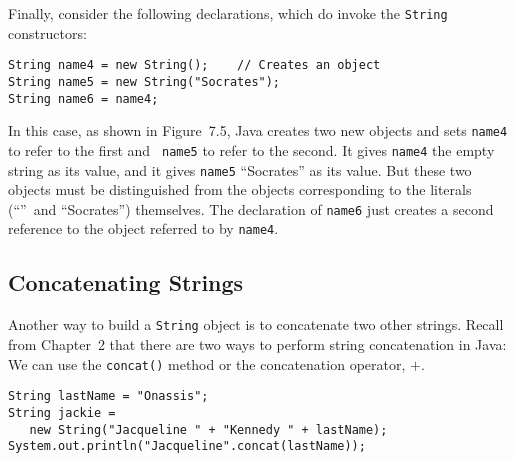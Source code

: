 Finally, consider the following declarations, which do invoke the
{\tt String} constructors:

\begin{jjjlisting}
\begin{lstlisting}
String name4 = new String();    // Creates an object
String name5 = new String("Socrates");
String name6 = name4;
\end{lstlisting}
\end{jjjlisting}

\noindent In this case, as shown in Figure~7.5,  Java creates 
two new objects and sets {\tt name4} to refer to the first and {\tt
name5} to refer to the second.  It gives {\tt name4} the empty string
as its value, and it gives {\tt name5} ``Socrates'' as its value.  But
these two objects must be distinguished from the objects corresponding
to the literals (``''~and ``Socrates'') themselves.  The
declaration of {\tt name6} just creates a second reference to the
object referred to by {\tt name4}.




\subsection{Concatenating Strings }
\noindent Another way to build a {\tt String} object is to concatenate
two other strings. Recall from Chapter~2 that there are two ways to
perform string concatenation in Java: We can use the {\tt concat()}
method or the concatenation operator, $+$.

\begin{jjjlisting}
\begin{lstlisting}
String lastName = "Onassis";
String jackie = 
   new String("Jacqueline " + "Kennedy " + lastName);
System.out.println("Jacqueline".concat(lastName));
\end{lstlisting}
\end{jjjlisting}

